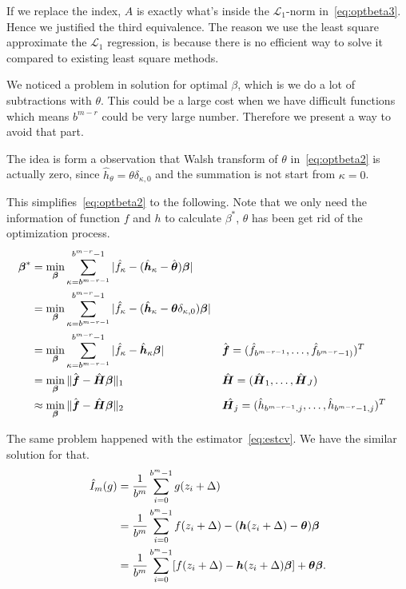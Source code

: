 If we replace the index, $A$ is exactly what's inside the $\mathcal{L}_1$-norm in~\eqref{eq:optbeta3}. 
Hence we justified the third equivalence. The reason we use the least square approximate the $\mathcal{L}_1$ regression, is because there is no efficient way to solve it compared to existing least square methods.


We noticed a problem in solution for optimal $\beta$, which is we do a lot of subtractions with $\theta$. This could be a large cost when we have difficult functions which means $b^{m-r}$ could be very large number. Therefore we present a way to avoid that part.

The idea is form a observation that Walsh transform of $\theta$ in~\eqref{eq:optbeta2} is actually zero, since $\hat{h}_\theta= \theta\delta_{\kappa,0}$ and the summation is not start from $\kappa=0$.

This simplifies~\eqref{eq:optbeta2} to the following. Note that we only need the information of function $f$ and $h$ to calculate $\beta^*$, $\theta$ has been get rid of the optimization process.
\begin{align}
    \boldsymbol{\beta}^*
    \label{eq:optbetanew}
    &=\min_{\boldsymbol{\beta}}\sum_{\kappa=b^{m-r-1}}^{b^{m-r}-1}|\hat{f}_\kappa
    -(\hat{\boldsymbol{h}}_\kappa - \hat{\boldsymbol{\theta}})\boldsymbol{\boldsymbol{\beta}}|\\
    &=\min_{\boldsymbol{\beta}}\sum_{\kappa=b^{m-r-1}}^{b^{m-r}-1}|\hat{f}_\kappa
    -(\hat{\boldsymbol{h}}_\kappa - \boldsymbol{\theta}\delta_{\kappa,0})\boldsymbol{\boldsymbol{\beta}}| \notag \\
    &=\min_{\boldsymbol{\beta}}\sum_{\kappa=b^{m-r-1}}^{b^{m-r}-1}|\hat{f}_\kappa
    -\hat{\boldsymbol{h}}_\kappa \boldsymbol{\boldsymbol{\beta}}|
    && \hat{\boldsymbol{f}}= (\hat{f}_{b^{m-r-1}},\dots,\hat{f}_{b^{m-r}-1)})^T \notag\\
    &=\min_{\boldsymbol{\beta}}\|\hat{\boldsymbol{f}}-\hat{\boldsymbol{H}}\boldsymbol{\beta}\|_1
    && \hat{\boldsymbol{H}}= (\hat{\boldsymbol{H}}_1, \dots, \hat{\boldsymbol{H}}_J)\notag \\
    &\approx\min_{\boldsymbol{\beta}}\|\hat{\boldsymbol{f}}-\hat{\boldsymbol{H}}\boldsymbol{\beta}\|_2
    &&\hat{\boldsymbol{H}_j}=(\hat{h}_{b^{m-r-1},j},\dots, \hat{h}_{b^{m-r}-1,j})^T \notag
\end{align}

The same problem happened with the estimator~\eqref{eq:estcv}. We have the similar solution for that.
\begin{align}
    \notag
    \hat{I}_m({g})
    & = \frac{1}{b^m}\sum_{i=0}^{b^m-1}g(z_i+\Delta)\\
    \notag
    & = \frac{1}{b^m}\sum_{i=0}^{b^m-1}f(z_i+\Delta)-(\boldsymbol{h}(z_i+\Delta)-\boldsymbol{\theta})\boldsymbol{\beta}\\
    \label{eq:estcvnew}
    & = \frac{1}{b^m}\sum_{i=0}^{b^m-1}[f(z_i+\Delta)-\boldsymbol{h}(z_i+\Delta)\boldsymbol{\beta}]+\boldsymbol{\theta}\boldsymbol{\beta}.
\end{align}

